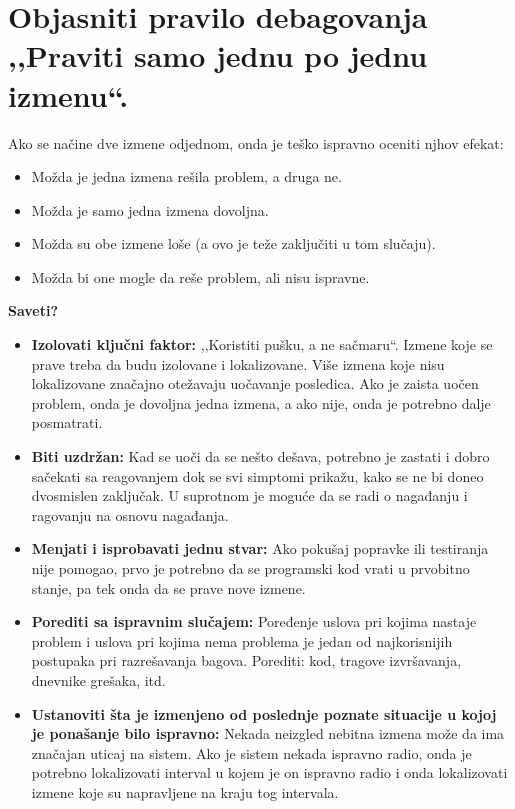 \documentclass[a4paper]{article}
\begin{document}
\section{Objasniti pravilo debagovanja ,,Praviti samo jednu po jednu izmenu``.}
  Ako se načine dve izmene odjednom, onda je teško ispravno oceniti njhov efekat:
  \begin{itemize}
    \item Možda je jedna izmena rešila problem, a druga ne.
    \item Možda je samo jedna izmena dovoljna.
    \item Možda su obe izmene loše (a ovo je teže zaključiti u tom slučaju).
    \item Možda bi one mogle da reše problem, ali nisu ispravne.
  \end{itemize}
  \textbf{Saveti?}
  \begin{itemize}
    \item \textbf{Izolovati ključni faktor:} ,,Koristiti pušku, a ne sačmaru``. Izmene koje se prave
          treba da budu izolovane i lokalizovane. Više izmena koje nisu lokalizovane značajno
          otežavaju uočavanje posledica. Ako je zaista uočen problem, onda je dovoljna jedna izmena,
          a ako nije, onda je potrebno dalje posmatrati.
    \item \textbf{Biti uzdržan:} Kad se uoči da se nešto dešava, potrebno je zastati i
          dobro sačekati sa reagovanjem dok se svi simptomi prikažu, kako se ne bi doneo
          dvosmislen zaključak. U suprotnom je moguće da se radi o nagađanju i ragovanju
          na osnovu nagađanja.
    \item \textbf{Menjati i isprobavati jednu stvar:} Ako pokušaj popravke ili testiranja nije pomogao,
          prvo je potrebno da se programski kod vrati u prvobitno stanje, pa tek onda da se prave
          nove izmene.
    \item \textbf{Porediti sa ispravnim slučajem:} Poređenje uslova pri kojima nastaje problem
          i uslova pri kojima nema problema je jedan od najkorisnijih postupaka pri razrešavanja
          bagova. Porediti: kod, tragove izvršavanja, dnevnike grešaka, itd.
    \item \textbf{Ustanoviti šta je izmenjeno od poslednje poznate situacije u kojoj je ponašanje
          bilo ispravno:} Nekada neizgled nebitna izmena može da ima značajan uticaj na sistem. Ako
          je sistem nekada ispravno radio, onda je potrebno lokalizovati interval u kojem
          je on ispravno radio i onda lokalizovati izmene koje su napravljene na kraju tog intervala.
  \end{itemize}
\end{document}
